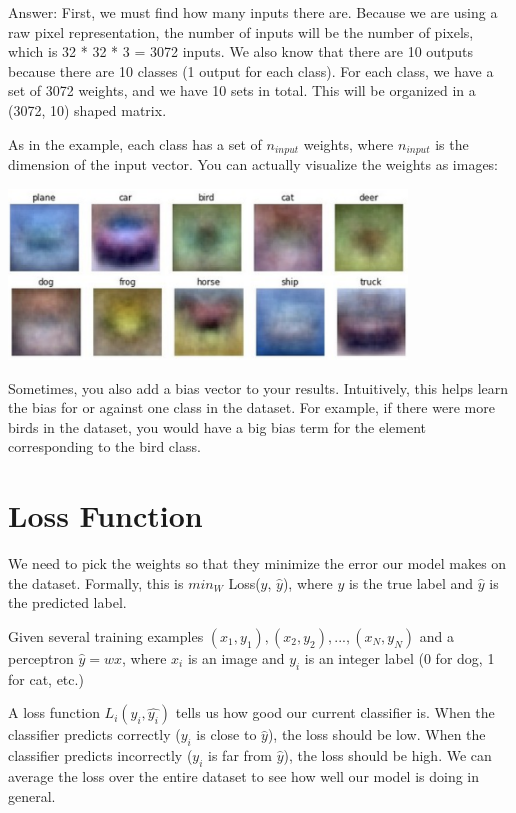 \documentclass{article}
\begin{document}
Answer: First, we must find how many inputs there are. Because we are using a raw pixel representation, the number of inputs will be the number of pixels, which is 32 * 32 * 3 = 3072 inputs. We also know that there are 10 outputs because there are 10 classes (1 output for each class). For each class, we have a set of 3072 weights, and we have 10 sets in total. This will be organized in a (3072, 10) shaped matrix.

\bigskip

As in the example, each class has a set of $n_{input}$ weights, where $n_{input}$ is the dimension of the input vector. You can actually visualize the weights as images:

\includegraphics[width=400px]{cs131_pic_1.png}

Sometimes, you also add a bias vector to your results. Intuitively, this helps learn the bias for or against one class in the dataset. For example, if there were more birds in the dataset, you would have a big bias term for the element corresponding to the bird class.

\section{Loss Function}

We need to pick the weights so that they minimize the error our model makes on the dataset. Formally, this is $min_W$ Loss($y$, $\hat{y}$), where $y$ is the true label and $\hat{y}$ is the predicted label.

Given several training examples ${(x_1, y_1), (x_2, y_2), ..., (x_N, y_N)}$ and a perceptron $\hat{y} = wx$, where $x_i$ is an image and $y_i$ is an integer label (0 for dog, 1 for cat, etc.)

A loss function $L_i(y_i, \hat{y_i})$ tells us how good our current classifier is. When the classifier predicts correctly ($y_i$ is close to $\hat{y}$), the loss should be low. When the classifier predicts incorrectly ($y_i$ is far from $\hat{y}$), the loss should be high. We can average the loss over the entire dataset to see how well our model is doing in general.
\end{document}
